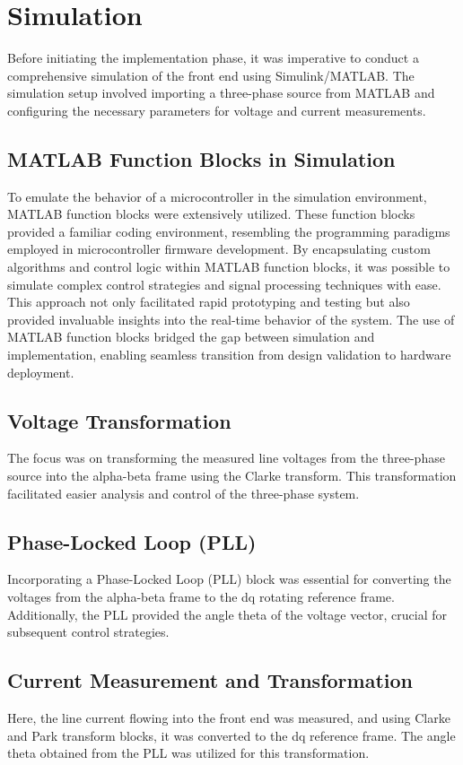 \section{Simulation}
Before initiating the implementation phase, it was imperative to conduct a
comprehensive simulation of the front end using Simulink/MATLAB. The simulation
setup involved importing a three-phase source from MATLAB and configuring the
necessary parameters for voltage and current measurements.

\subsection{MATLAB Function Blocks in Simulation}
To emulate the behavior of a microcontroller in the simulation environment,
MATLAB function blocks were extensively utilized. These function blocks
provided a familiar coding environment, resembling the programming paradigms
employed in microcontroller firmware development. By encapsulating custom
algorithms and control logic within MATLAB function blocks, it was possible to
simulate complex control strategies and signal processing techniques with ease.
This approach not only facilitated rapid prototyping and testing but also
provided invaluable insights into the real-time behavior of the system. The use
of MATLAB function blocks bridged the gap between simulation and
implementation, enabling seamless transition from design validation to hardware
deployment.

\subsection{Voltage Transformation}
The focus was on transforming the measured line voltages from the three-phase
source into the alpha-beta frame using the Clarke transform. This
transformation facilitated easier analysis and control of the three-phase
system.

\subsection{Phase-Locked Loop (PLL)}
Incorporating a Phase-Locked Loop (PLL) block was essential for converting the
voltages from the alpha-beta frame to the dq rotating reference frame.
Additionally, the PLL provided the angle theta of the voltage vector, crucial
for subsequent control strategies.

\subsection{Current Measurement and Transformation}
Here, the line current flowing into the front end was measured, and using
Clarke and Park transform blocks, it was converted to the dq reference frame.
The angle theta obtained from the PLL was utilized for this transformation.

